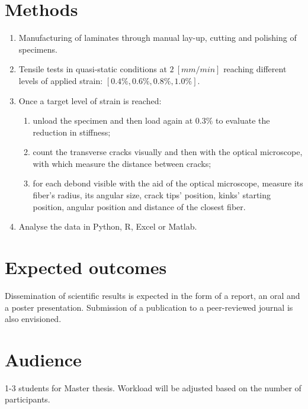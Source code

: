 \documentclass[review]{elsarticle}
\begin{document}
\section{Methods}
\begin{enumerate}
\item Manufacturing of laminates through manual lay-up, cutting and polishing of specimens.
\item Tensile tests in quasi-static conditions at $2\ \left[mm/min\right]$ reaching different levels of applied strain: $\left[0.4\%, 0.6\%, 0.8\%, 1.0\%\right]$.
\item Once a target level of strain is reached:
\begin{enumerate}[label=\alph*]
\item unload the specimen and then load again at $0.3\%$ to evaluate the reduction in stiffness;
\item count the transverse cracks visually and then with the optical microscope, with which measure the distance between cracks;
\item for each debond visible with the aid of the optical microscope, measure its fiber's radius, its angular size, crack tips' position, kinks' starting position, angular position and distance of the closest fiber.
\end{enumerate}
\item Analyse the data in Python, R, Excel or Matlab.
\end{enumerate}

\section{Expected outcomes}
Dissemination of scientific results is expected in the form of a report, an oral and a poster presentation. Submission of a publication to a peer-reviewed journal is also envisioned.

\section{Audience}
1-3 students for Master thesis. Workload will be adjusted based on the number of participants.



\end{document}
